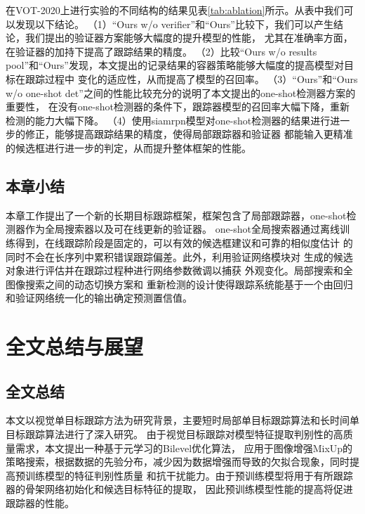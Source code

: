 \documentclass[promaster]{thesis-uestc}
\begin{document}
在VOT-2020上进行实验的不同结构的结果见表\ref{tab:ablation}所示。从表中我们可以发现以下结论。
（1）“Ours w/o verifier”和“Ours”比较下，我们可以产生结论，我们提出的验证器方案能够大幅度的提升模型的性能，
尤其在准确率方面，在验证器的加持下提高了跟踪结果的精度。
（2）比较“Ours w/o results pool”和“Ours”发现，本文提出的记录结果的容器策略能够大幅度的提高模型对目标在跟踪过程中
变化的适应性，从而提高了模型的召回率。
（3）“Ours”和“Ours w/o one-shot det”之间的性能比较充分的说明了本文提出的one-shot检测器方案的重要性，
在没有one-shot检测器的条件下，跟踪器模型的召回率大幅下降，重新检测的能力大幅下降。
（4）使用siamrpn模型对one-shot检测器的结果进行进一步的修正，能够提高跟踪结果的精度，使得局部跟踪器和验证器
都能输入更精准的候选框进行进一步的判定，从而提升整体框架的性能。

\section{本章小结}
本章工作提出了一个新的长期目标跟踪框架，框架包含了局部跟踪器，one-shot检测器作为全局搜索器以及可在线更新的验证器。
one-shot全局搜索器通过离线训练得到，在线跟踪阶段是固定的，可以有效的候选框建议和可靠的相似度估计
的同时不会在长序列中累积错误跟踪偏差。此外，利用验证网络模块对
生成的候选对象进行评估并在跟踪过程种进行网络参数微调以捕获
外观变化。局部搜索和全图像搜索之间的动态切换方案和
重新检测的设计使得跟踪系统能基于一个由回归和验证网络统一化的输出确定预测置信值。




\chapter{全文总结与展望}

\section{全文总结}
本文以视觉单目标跟踪方法为研究背景，主要短时局部单目标跟踪算法和长时间单目标跟踪算法进行了深入研究。
由于视觉目标跟踪对模型特征提取判别性的高质量需求，本文提出一种基于元学习的Bilevel优化算法，
应用于图像增强MixUp的策略搜索，根据数据的先验分布，减少因为数据增强而导致的欠拟合现象，同时提高预训练模型的特征判别性质量
和抗干扰能力。由于预训练模型将用于有所跟踪器的骨架网络初始化和候选目标特征的提取，
因此预训练模型性能的提高将促进跟踪器的性能。
\end{document}

